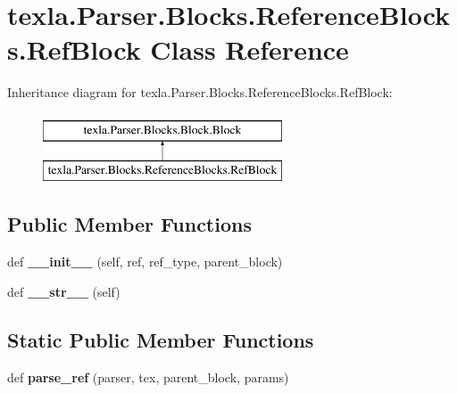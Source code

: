 \hypertarget{classtexla_1_1Parser_1_1Blocks_1_1ReferenceBlocks_1_1RefBlock}{}\section{texla.\+Parser.\+Blocks.\+Reference\+Blocks.\+Ref\+Block Class Reference}
\label{classtexla_1_1Parser_1_1Blocks_1_1ReferenceBlocks_1_1RefBlock}
Inheritance diagram for texla.\+Parser.\+Blocks.\+Reference\+Blocks.\+Ref\+Block\+:\begin{figure}[H]
\begin{center}
\leavevmode
\includegraphics[height=2.000000cm]{classtexla_1_1Parser_1_1Blocks_1_1ReferenceBlocks_1_1RefBlock}
\end{center}
\end{figure}
\subsection*{Public Member Functions}
\begin{DoxyCompactItemize}
\item 
\hypertarget{classtexla_1_1Parser_1_1Blocks_1_1ReferenceBlocks_1_1RefBlock_a9534ccf3ca3cf585e4a8f9f692d0a347}{}\label{classtexla_1_1Parser_1_1Blocks_1_1ReferenceBlocks_1_1RefBlock_a9534ccf3ca3cf585e4a8f9f692d0a347} 
def {\bfseries \+\_\+\+\_\+init\+\_\+\+\_\+} (self, ref, ref\+\_\+type, parent\+\_\+block)
\item 
\hypertarget{classtexla_1_1Parser_1_1Blocks_1_1ReferenceBlocks_1_1RefBlock_a6eb2d28fe8dd4fe4aeedfca0d9bc0190}{}\label{classtexla_1_1Parser_1_1Blocks_1_1ReferenceBlocks_1_1RefBlock_a6eb2d28fe8dd4fe4aeedfca0d9bc0190} 
def {\bfseries \+\_\+\+\_\+str\+\_\+\+\_\+} (self)
\end{DoxyCompactItemize}
\subsection*{Static Public Member Functions}
\begin{DoxyCompactItemize}
\item 
\hypertarget{classtexla_1_1Parser_1_1Blocks_1_1ReferenceBlocks_1_1RefBlock_a5070acc406d4b3b8da49845e910c09e9}{}\label{classtexla_1_1Parser_1_1Blocks_1_1ReferenceBlocks_1_1RefBlock_a5070acc406d4b3b8da49845e910c09e9} 
def {\bfseries parse\+\_\+ref} (parser, tex, parent\+\_\+block, params)
\end{DoxyCompactItemize}
